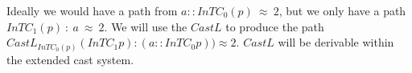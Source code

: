 Ideally we would have a path from $a::InTC_{0}(p)\ \approx\ 2$, but we only have a path $InTC_{1}(p)\ :\ a\ \approx\ 2$.
We will use the $CastL$ to produce the path $CastL_{InTC_{0}(p)}\left(InTC_{1}p\right):(a::InTC_{0}p))\approx2$.
$CastL$ will be derivable within the extended cast system.









